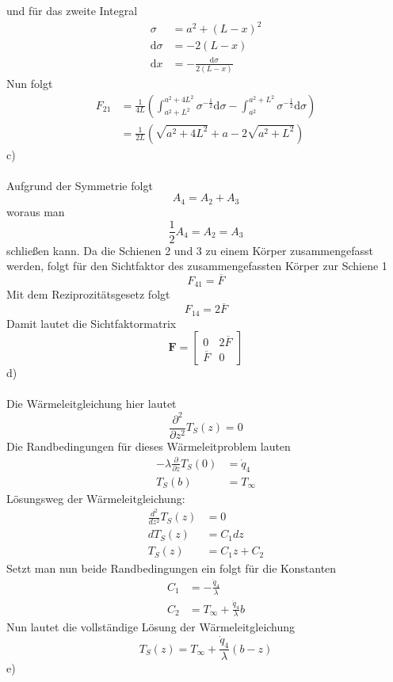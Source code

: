 und für das zweite Integral
\begin{align*}
	\sigma &= a^2 + (L - x)^2 \\
	\text{d}\sigma &= -2(L - x) \\
	\text{d}x &= -\frac{\text{d}\sigma}{2(L - x)}
\end{align*}
Nun folgt
\begin{align*}
	F_{21} &= \frac{1}{4L}\left( \int_{a^2 + L^2}^{a^2 + 4L^2} \sigma^{-\frac{1}{2}}\text{d}\sigma -  \int_{a^2}^{a^2 + L^2}\sigma^{-\frac{1}{2}}\text{d}\sigma\right) \\
	&= \frac{1}{2L} \left(\sqrt{a^2 + 4L^2} +  a - 2\sqrt{a^2 + L^2}\right)
\end{align*}
c)\\ \\
Aufgrund der Symmetrie folgt 
\[
	A_4 = A_2 + A_3
\]
woraus man 
\[
	\frac{1}{2}A_4 = A_2 = A_3
\]
schließen kann.
Da die Schienen 2 und 3 zu einem Körper zusammengefasst werden, folgt für den Sichtfaktor des zusammengefassten Körper zur Schiene 1
\[
	F_{41} = \overline{F}
\]
Mit dem Reziprozitätsgesetz folgt
\[
	F_{14} = 2\overline{F}
\]
Damit lautet die Sichtfaktormatrix
\[
	\textbf{F} = \begin{bmatrix}
		0 & 2\overline{F} \\
		\overline{F} & 0
	\end{bmatrix}
\]
d)\\ \\
Die Wärmeleitgleichung hier lautet
\[
	\frac{\partial^2}{\partial z^2}T_S(z) = 0
\]
Die Randbedingungen für dieses Wärmeleitproblem lauten
\begin{align*}
	-\lambda\frac{\partial}{\partial z}T_S(0) &= \dot{q}_4 \\
	 T_S(b) &= T_\infty
\end{align*}
Lösungsweg der Wärmeleitgleichung:
\begin{align*}
	\frac{d^2}{d z^2}T_S(z) &= 0 \\
	dT_S(z) &= C_1 dz \\
	T_S(z) &= C_1 z + C_2
\end{align*}
Setzt man nun beide Randbedingungen ein folgt für die Konstanten
\begin{align*}
	C_1 &= -\frac{\dot{q}_4}{\lambda} \\
	C_2 &= T_\infty + \frac{\dot{q}_4}{\lambda}b
\end{align*}
Nun lautet die vollständige Lösung der Wärmeleitgleichung
\[
	T_S(z) = T_\infty + \frac{\dot{q}_4}{\lambda}(b - z)
\]
e)\\ \\

